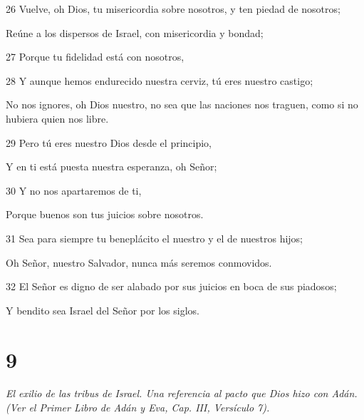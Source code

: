 \par   
\par 26 Vuelve, oh Dios, tu misericordia sobre nosotros, y ten piedad de nosotros;
\par     Reúne a los dispersos de Israel, con misericordia y bondad;
\par 27 Porque tu fidelidad está con nosotros,
\par 28 Y aunque hemos endurecido nuestra cerviz, tú eres nuestro castigo;
\par     No nos ignores, oh Dios nuestro, no sea que las naciones nos traguen, como si no hubiera quien nos libre.
\par   
\par 29 Pero tú eres nuestro Dios desde el principio,
\par     Y en ti está puesta nuestra esperanza, oh Señor;
\par 30 Y no nos apartaremos de ti,
\par     Porque buenos son tus juicios sobre nosotros.
\par 31 Sea para siempre tu beneplácito el nuestro y el de nuestros hijos;
\par     Oh Señor, nuestro Salvador, nunca más seremos conmovidos.
\par 32 El Señor es digno de ser alabado por sus juicios en boca de sus piadosos;
\par     Y bendito sea Israel del Señor por los siglos.

\chapter{9}

\par \textit{El exilio de las tribus de Israel. Una referencia al pacto que Dios hizo con Adán. (Ver el Primer Libro de Adán y Eva, Cap. III, Versículo 7).}

